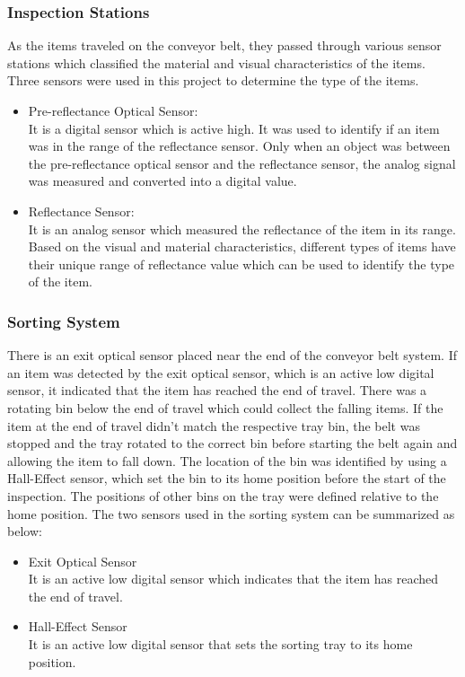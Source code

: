 \subsubsection{Inspection Stations}
As the items traveled on the conveyor belt, they passed through various sensor stations which classified the material and visual characteristics of the items. Three sensors were used in this project to determine the type of the items.
\begin{itemize}
	\item Pre-reflectance Optical Sensor:\\
	It is a digital sensor which is active high. It was used to identify if an item was in the range of the reflectance sensor. Only when an object was between the pre-reflectance optical sensor and the reflectance sensor, the analog signal was measured and converted into a digital value.
	\item Reflectance Sensor:\\
	It is an analog sensor which measured the reflectance of the item in its range. Based on the visual and material characteristics, different types of items have their unique range of reflectance value which can be used to identify the type of the item.
\end{itemize}

\subsubsection{Sorting System}
There is an exit optical sensor placed near the end of the conveyor belt system. If an item was detected by the exit optical sensor, which is an active low digital sensor, it indicated that the item has reached the end of travel. There was a rotating bin below the end of travel which could collect the falling items. If the item at the end of travel didn't match the respective tray bin, the belt was stopped and the tray rotated to the correct bin before starting the belt again and allowing the item to fall down. The location of the bin was identified by using a Hall-Effect sensor, which set the bin to its home position before the start of the inspection. The positions of other bins on the tray were defined relative to the home position. The two sensors used in the sorting system can be summarized as below:
\begin{itemize}
	\item Exit Optical Sensor\\
	It is an active low digital sensor which indicates that the item has reached the end of travel.
	\item Hall-Effect Sensor\\
	It is an active low digital sensor that sets the sorting tray to its home position.
\end{itemize}